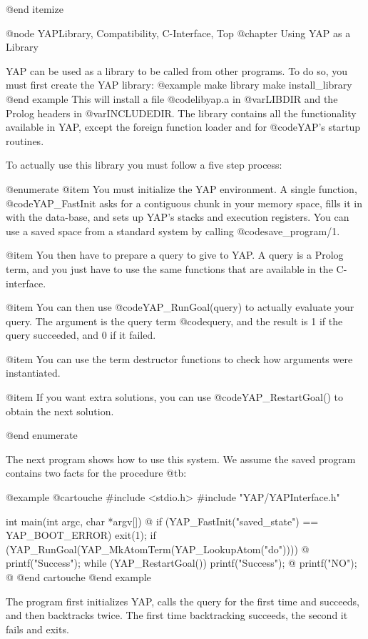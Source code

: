 {{{{{{{{@end itemize

@node YAPLibrary, Compatibility, C-Interface, Top
@chapter Using YAP as a Library

YAP can be used as a library to be called from other
programs. To do so, you must first create the YAP library:
@example
make library
make install_library
@end example
This will install a file @code{libyap.a} in @var{LIBDIR} and the Prolog
headers in @var{INCLUDEDIR}. The library contains all the functionality
available in YAP, except the foreign function loader and for
@code{YAP}'s startup routines.

To actually use this library you must follow a five step process:

@enumerate
@item
 You must initialize the YAP environment. A single function,
@code{YAP_FastInit} asks for a contiguous chunk in your memory space, fills
it in with the data-base, and sets up YAP's stacks and
execution registers. You can use a saved space from a standard system by
calling @code{save_program/1}.
     
@item You then have to prepare a query to give to
YAP. A query is a Prolog term, and you just have to use the same
functions that are available in the C-interface.

@item You can then use @code{YAP_RunGoal(query)} to actually evaluate your
query. The argument is the query term @code{query}, and the result is 1
if the query succeeded, and 0 if it failed.

@item You can use the term destructor functions to check how
arguments were instantiated.

@item If you want extra solutions, you can use
@code{YAP_RestartGoal()} to obtain the next solution.

@end enumerate

The next program shows how to use this system. We assume the saved
program contains two facts for the procedure @t{b}:

@example
@cartouche
#include <stdio.h>
#include "YAP/YAPInterface.h"


int
main(int argc, char *argv[]) @{
  if (YAP_FastInit("saved_state") == YAP_BOOT_ERROR)
    exit(1);
  if (YAP_RunGoal(YAP_MkAtomTerm(YAP_LookupAtom("do")))) @{
    printf("Success\n");
    while (YAP_RestartGoal())
      printf("Success\n");
  @}
  printf("NO\n");
@}
@end cartouche
@end example

The program first initializes YAP, calls the query for the
first time and succeeds, and then backtracks twice. The first time
backtracking succeeds, the second it fails and exits.

}}}}}}}}
